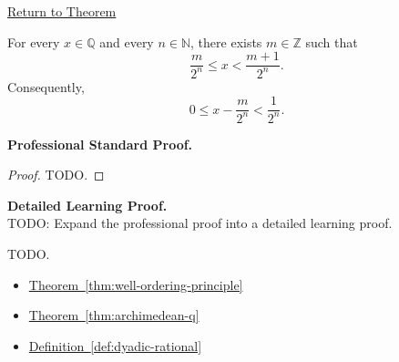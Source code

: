 \newpage
{}
\label{prf:dyadic-approximation-error-bound}

\begin{remark*}[Return]
\hyperref[thm:dyadic-approximation-error-bound]{Return to Theorem}
\end{remark*}

\begin{theorem*}
For every $x\in\mathbb{Q}$ and every $n\in\mathbb{N}$, there exists
$m\in\mathbb{Z}$ such that
\[
\frac{m}{2^n}\le x<\frac{m+1}{2^n}.
\]
Consequently,
\[
0\le x-\frac{m}{2^n}<\frac{1}{2^n}.
\]
\end{theorem*}

\textbf{Professional Standard Proof.}~\\
\begin{proof}
TODO.
\end{proof}

\textbf{Detailed Learning Proof.}~\\
TODO: Expand the professional proof into a detailed learning proof.


\begin{remark*}
TODO.
\end{remark*}

\begin{dependencies}
\begin{itemize}
  \item \hyperref[thm:well-ordering-principle]{Theorem~\ref*{thm:well-ordering-principle}}
  \item \hyperref[thm:archimedean-q]{Theorem~\ref*{thm:archimedean-q}}
  \item \hyperref[def:dyadic-rational]{Definition~\ref*{def:dyadic-rational}}
\end{itemize}
\end{dependencies}
